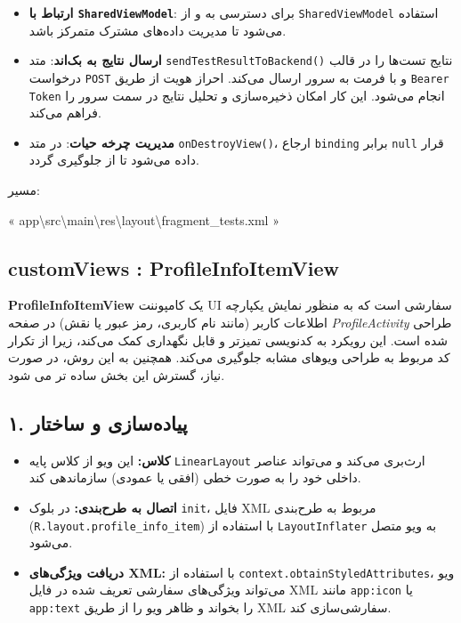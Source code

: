 \documentclass{report}
\begin{document}
\begin{itemize}
	\item \textbf{ارتباط با \texttt{SharedViewModel}}: برای دسترسی به  و  از \texttt{SharedViewModel} استفاده می‌شود تا مدیریت داده‌های مشترک متمرکز باشد.
	\item \textbf{ارسال نتایج به بک‌اند}: متد \texttt{sendTestResultToBackend()} نتایج تست‌ها را در قالب درخواست \texttt{POST} و با فرمت  به سرور ارسال می‌کند. 
	احراز هویت از طریق \texttt{Bearer Token} انجام می‌شود. این کار امکان ذخیره‌سازی و تحلیل نتایج در سمت سرور را فراهم می‌کند.
	\item \textbf{مدیریت چرخه حیات}: در متد \texttt{onDestroyView()}، ارجاع \texttt{binding} برابر \texttt{null} قرار داده می‌شود تا از  جلوگیری گردد.
\end{itemize}
\begin{note}{مسیر:}
	\begin{latin}
	« app\textbackslash src\textbackslash main\textbackslash res\textbackslash layout\textbackslash fragment\_tests.xml »
	\end{latin}
\end{note}

\subsection{customViews :  ProfileInfoItemView}


\textbf{ProfileInfoItemView} یک کامپوننت UI سفارشی است که به منظور نمایش یکپارچه اطلاعات کاربر (مانند نام کاربری، رمز عبور یا نقش) در صفحه \textit{ProfileActivity} طراحی شده است. این رویکرد به کدنویسی تمیزتر و قابل نگهداری کمک می‌کند، زیرا از تکرار کد مربوط به طراحی ویوهای مشابه جلوگیری می‌کند. همچنین به این روش، در صورت نیاز،  گسترش این بخش ساده تر می شود.

\subsection*{۱. پیاده‌سازی و ساختار}
\begin{itemize}
	\item \textbf{کلاس:} این ویو از کلاس پایه \texttt{LinearLayout} ارث‌بری می‌کند و می‌تواند عناصر داخلی خود را به صورت خطی (افقی یا عمودی) سازماندهی کند.
	\item \textbf{اتصال به طرح‌بندی:} در بلوک \texttt{init}، فایل XML مربوط به طرح‌بندی (\texttt{R.layout.profile\_info\_item}) با استفاده از \texttt{LayoutInflater} به ویو متصل می‌شود.
	\item \textbf{دریافت ویژگی‌های XML:} با استفاده از \texttt{context.obtainStyledAttributes}، ویو می‌تواند ویژگی‌های سفارشی تعریف شده در فایل XML مانند \texttt{app:icon} یا \texttt{app:text} را بخواند و ظاهر ویو را از طریق XML سفارشی‌سازی کند.
\end{itemize}
\end{document}
